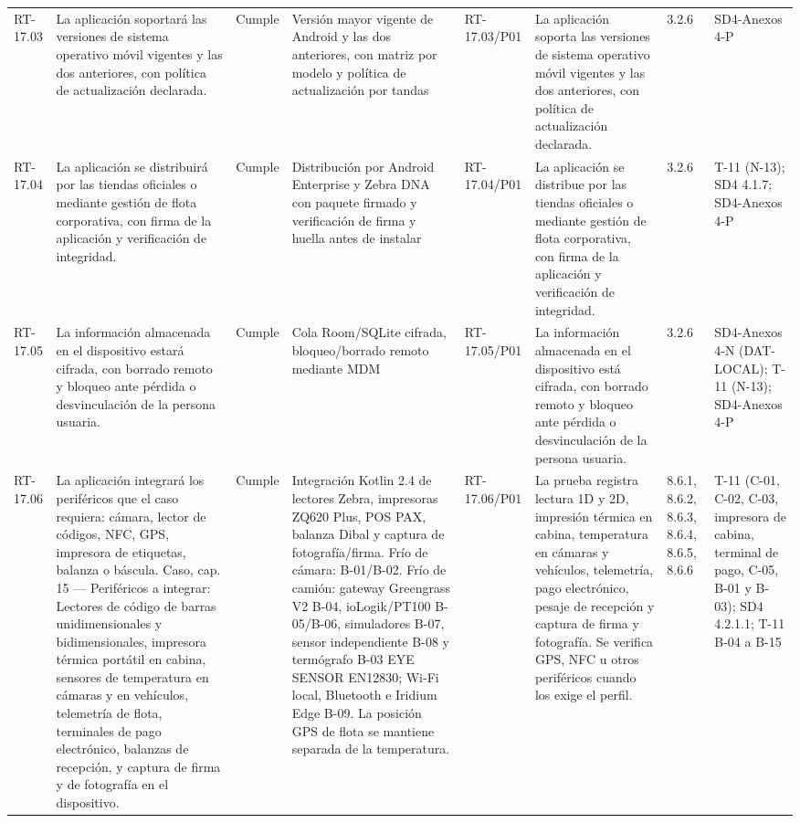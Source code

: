 \documentclass[oficio,firma,final]{lafrox}
\begin{document}
\begin{landscape}
{\begin{longtable}{@{}F{0.054} F{0.173} F{0.061} F{0.191} F{0.106} F{0.180} F{0.067} F{0.168}@{}}
  RT-17.03 & La aplicación soportará las versiones de sistema operativo móvil vigentes y las dos anteriores, con política de actualización declarada. & Cumple & Versión mayor vigente de Android y las dos anteriores, con matriz por modelo y política de actualización por tandas & RT-17.03/\allowbreak{}P01 & La aplicación soporta las versiones de sistema operativo móvil vigentes y las dos anteriores, con política de actualización declarada. & 3.2.6 & SD4-Anexos 4-P  \\
  RT-17.04 & La aplicación se distribuirá por las tiendas oficiales o mediante gestión de flota corporativa, con firma de la aplicación y verificación de integridad. & Cumple & Distribución por Android Enterprise y Zebra DNA con paquete firmado y verificación de firma y huella antes de instalar & RT-17.04/\allowbreak{}P01 & La aplicación se distribue por las tiendas oficiales o mediante gestión de flota corporativa, con firma de la aplicación y verificación de integridad. & 3.2.6 & T-11 (N-13); SD4 4.1.7; SD4-Anexos 4-P  \\
  RT-17.05 & La información almacenada en el dispositivo estará cifrada, con borrado remoto y bloqueo ante pérdida o desvinculación de la persona usuaria. & Cumple & Cola Room/SQLite cifrada, bloqueo/borrado remoto mediante MDM & RT-17.05/\allowbreak{}P01 & La información almacenada en el dispositivo está cifrada, con borrado remoto y bloqueo ante pérdida o desvinculación de la persona usuaria. & 3.2.6 & SD4-Anexos 4-N (DAT-LOCAL); T-11 (N-13); SD4-Anexos 4-P  \\
  RT-17.06 & La aplicación integrará los periféricos que el caso requiera: cámara, lector de códigos, NFC, GPS, impresora de etiquetas, balanza o báscula. Caso, cap. 15 — Periféricos a integrar: Lectores de código de barras unidimensionales y bidimensionales, impresora térmica portátil en cabina, sensores de temperatura en cámaras y en vehículos, telemetría de flota, terminales de pago electrónico, balanzas de recepción, y captura de firma y de fotografía en el dispositivo. & Cumple & Integración Kotlin 2.4 de lectores Zebra, impresoras ZQ620 Plus, POS PAX, balanza Dibal y captura de fotografía/firma. Frío de cámara: B-01/B-02. Frío de camión: gateway Greengrass V2 B-04, ioLogik/PT100 B-05/B-06, simuladores B-07, sensor independiente B-08 y termógrafo B-03 EYE SENSOR EN12830; Wi-Fi local, Bluetooth e Iridium Edge B-09. La posición GPS de flota se mantiene separada de la temperatura. & RT-17.06/\allowbreak{}P01 & La prueba registra lectura 1D y 2D, impresión térmica en cabina, temperatura en cámaras y vehículos, telemetría, pago electrónico, pesaje de recepción y captura de firma y fotografía. Se verifica GPS, NFC u otros periféricos cuando los exige el perfil. & 8.6.1, 8.6.2, 8.6.3, 8.6.4, 8.6.5, 8.6.6 & T-11 (C-01, C-02, C-03, impresora de cabina, terminal de pago, C-05, B-01 y B-03); SD4 4.2.1.1; T-11 B-04 a B-15  \\

\end{longtable}}
\end{landscape}
\end{document}

